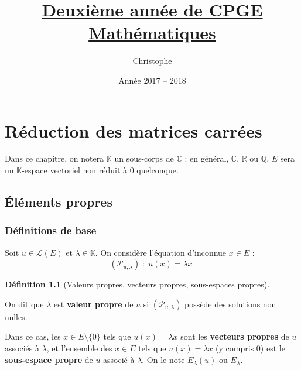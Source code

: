\documentclass[12pt]{book}
\title{\Huge{\underline{\textbf{Deuxième année de CPGE}}} \\ \underline{\textbf{Mathématiques}}}
\author{\Large{Christophe \bsc{Néraud}}}
\date{Année 2017 -- 2018}
\let\ensembleNombre\mathbb
\newcommand*\Q{\ensuremath{\ensembleNombre{Q}}}
\newcommand*\R{\ensuremath{\ensembleNombre{R}}}
\newcommand*\C{\ensuremath{\ensembleNombre{C}}}
\newcommand*\K{\ensuremath{\ensembleNombre{K}}}
\theoremstyle{definition}
\newtheorem*{defi}{Définition}
\theoremstyle{remark}
\newenvironment{fdef}
  {\begin{mdframed}[roundcorner=10pt, linewidth=1pt]\begin{defi}}
  {\end{defi}\end{mdframed}}
\begin{document}
\maketitle

\tableofcontents

\chapter{Réduction des matrices carrées}

Dans ce chapitre, on notera $\K$ un sous-corps de $\C$ : en général, $\C$, $\R$ ou $\Q$. $E$ sera un $\K$-espace vectoriel non réduit à 0 quelconque.

\section{Éléments propres}
	\subsection{Définitions de base}
	
	Soit $u \in \mathcal L(E)$ et $\lambda \in \K$. On considère l'équation d'inconnue $x \in E$ :	
	\[\boxed{(\mathcal P_{u,\lambda}) \; : \; u(x) = \lambda x \;}\]
			
	\begin{fdef}[Valeurs propres, vecteurs propres, sous-espaces propres] \mbox{~}
	
	
	On dit que $\lambda$ est \textbf{valeur propre} de $u$ si $(\mathcal P_{u,\lambda})$ possède des solutions non nulles. 
	
	Dans ce cas, les $x \in E \setminus \lbrace 0 \rbrace$ tels que $u(x) = \lambda x$ sont les \textbf{vecteurs propres} de $u$ associés à $\lambda$, et l'ensemble des $x \in E$ tels que $u(x) = \lambda x$ (y compris 0) est le \textbf{sous-espace propre} de $u$ associé à $\lambda$. On le note $E_\lambda(u)$ ou $E_\lambda$.
	\end{fdef}
	
\end{document}
